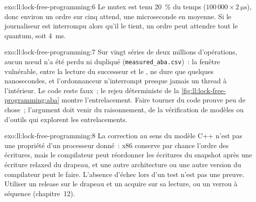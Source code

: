 \begin{solution}{exo:ll:lock-free-programming:6}
Le mutex est tenu 20~\% du temps ($100\,000 \times \qty{2}{\micro\second}$), donc environ un ordre sur cinq attend, une microseconde en moyenne.
Si le journaliseur est interrompu alors qu'il le tient, un ordre peut attendre tout le quantum, soit \qty{4}{\milli\second}.
\end{solution}

\begin{solution}{exo:ll:lock-free-programming:7} \sloppy
Sur vingt séries de deux millions d'opérations, aucun nœud n'a été perdu ni dupliqué (\texttt{measured\_aba.csv})~: la fenêtre vulnérable, entre la lecture du successeur
et le , ne dure que quelques nanosecondes, et l'ordonnanceur n'interrompt presque jamais un thread à l'intérieur.
Le code reste faux~; le rejeu déterministe de la \cref{fig:ll:lock-free-programming:aba} montre l'entrelacement.
Faire tourner du code  prouve peu de chose~; l'argument doit venir du raisonnement, de la vérification de modèles ou d'outils
qui explorent les entrelacements.
\end{solution}

\begin{solution}{exo:ll:lock-free-programming:8}
La correction au sens du modèle C++ n'est pas une propriété d'un processeur donné~: x86 conserve par chance l'ordre des écritures, mais le compilateur peut
réordonner les écritures du snapshot après une écriture relaxed du drapeau, et une autre architecture ou une autre version du compilateur peut le faire. L'absence d'échec
lors d'un test n'est pas une preuve. Utiliser un release sur le drapeau et un acquire sur sa lecture, ou un verrou à séquence (chapitre~12).
\end{solution}

